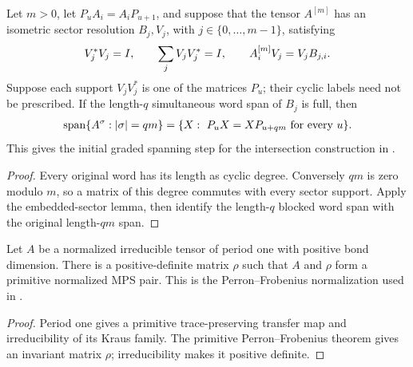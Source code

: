 \begin{lemma}
    \label{thm:cyclic_blocked_initial_word_span}
    \leanok
    Let $m>0$, let $P_uA_i=A_iP_{u+1}$, and suppose that the tensor
    $A^{[m]}$ has an isometric sector resolution $B_j,V_j$, with
    $j\in\{0,\ldots,m-1\}$, satisfying
    \begin{align}
        V_j^*V_j=I,\qquad \sum_jV_jV_j^*=I,\qquad
        A^{[m]}_iV_j=V_jB_{j,i}.
        \notag
    \end{align}
    Suppose each support $V_jV_j^*$ is one of the matrices $P_u$;
    their cyclic labels need not be prescribed.
    If the length-$q$ simultaneous word span of $B_j$ is full, then
    \begin{align}
        \operatorname{span}\{A^\sigma:|\sigma|=qm\}
        =\{X:\ P_uX=XP_{u+qm}\text{ for every }u\}.
        \notag
    \end{align}
    This gives the initial graded spanning step for the intersection
    construction in \cite[equations (3.10)--(3.11) and Section~6]
    {Nachtergaele1996Spectral}.
\end{lemma}
\begin{proof}\leanok
    Every original word has its length as cyclic degree. Conversely $qm$
    is zero modulo $m$, so a matrix of this degree commutes with every
    sector support. Apply the embedded-sector lemma, then identify the
    length-$q$ blocked word span with the original length-$qm$ span.
\end{proof}

\begin{lemma}
    \label{thm:period_one_primitive_witness}
    \leanok
    Let $A$ be a normalized irreducible tensor of period one with positive
    bond dimension. There is a positive-definite matrix $\rho$ such that
    $A$ and $\rho$ form a primitive normalized MPS pair.
    This is the Perron--Frobenius normalization used in
    \cite[Equations~(3.1)--(3.2b)]{Nachtergaele1996Spectral}.
\end{lemma}
\begin{proof}\leanok
    Period one gives a primitive trace-preserving transfer map and
    irreducibility of its Kraus family. The primitive Perron--Frobenius
    theorem gives an invariant matrix $\rho$; irreducibility makes it
    positive definite.
\end{proof}

